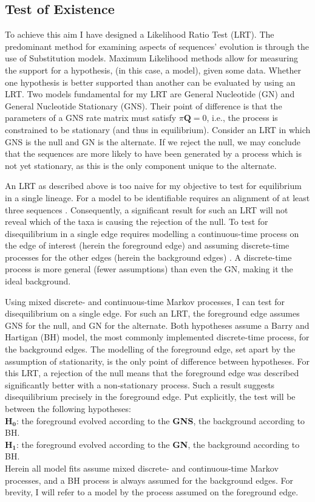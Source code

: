 \subsection{Test of Existence}

To achieve this aim I have designed a Likelihood Ratio Test (LRT). The predominant method for examining aspects of sequences' evolution is through the use of \glspl{Substitution model}. \Gls{Maximum Likelihood} methods allow for measuring the support for a hypothesis, (in this case, a \gls{model}), given some data. Whether one hypothesis is better supported than another can be evaluated by using an LRT. Two models fundamental for my LRT are General Nucleotide (GN) and General Nucleotide Stationary (GNS). Their point of difference is that the parameters of a GNS rate matrix must satisfy $\pi\mathbf{Q}=0$, i.e., the process is constrained to be stationary (and thus in equilibrium). Consider an LRT in which GNS is the null and GN is the alternate. If we reject the null, we may conclude that the sequences are more likely to have been generated by a process which is not yet stationary, as this is the only component unique to the alternate.

An LRT as described above is too naive for my objective to test for equilibrium in a single lineage. For a model to be \gls{identifiable} requires an alignment of at least three sequences \cite{Chang1996FullConsistency}. Consequently, a significant result for such an LRT will not reveal which of the taxa is causing the rejection of the null. To test for disequilibrium in a single \gls{edge} requires  modelling a continuous-time process on the edge of interest (herein the foreground edge) and assuming discrete-time processes for the other edges (herein the background edges) \cite{Verbyla2013TheSubstitution}. A discrete-time process is more general (fewer assumptions) than even the GN, making it the ideal background. 

Using mixed discrete- and continuous-time Markov processes, I can test for disequilibrium on a single edge. For such an LRT, the foreground edge assumes GNS for the null, and GN for the alternate. Both hypotheses assume a Barry and Hartigan (BH) model, the most commonly implemented discrete-time process, for the background edges. The modelling of the foreground edge, set apart by the assumption of stationarity, is the only point of difference between hypotheses. For this LRT, a rejection of the null means that the foreground edge was described significantly better with a non-stationary process. Such a result suggests disequilibrium precisely in the foreground edge. Put explicitly, the test will be between the following hypotheses:\\ $\mathbf{H_0}$: the foreground evolved according to the \textbf{GNS}, the background according to BH. \\ $\mathbf{H_1}$: the foreground evolved according to the \textbf{GN}, the background according to BH.\\
\noindent Herein all model fits assume mixed discrete- and continuous-time Markov processes, and a BH process is always assumed for the background edges. For brevity, I will refer to a model by the process assumed on the foreground edge.

